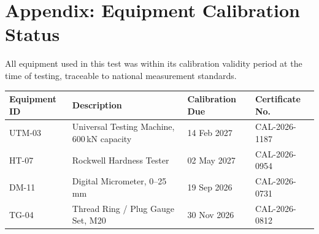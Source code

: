 \section{Appendix: Equipment Calibration Status}

All equipment used in this test was within its calibration validity period at the time of
testing, traceable to national measurement standards.

\begin{tabularx}{\linewidth}{@{}p{2.6cm}Xp{2.6cm}X@{}}
\toprule
\textbf{Equipment ID} & \textbf{Description} & \textbf{Calibration Due} & \textbf{Certificate No.} \\
\midrule
UTM-03 & Universal Testing Machine, 600\,kN capacity & 14 Feb 2027 & CAL-2026-1187 \\
HT-07 & Rockwell Hardness Tester & 02 May 2027 & CAL-2026-0954 \\
DM-11 & Digital Micrometer, 0--25\,mm & 19 Sep 2026 & CAL-2026-0731 \\
TG-04 & Thread Ring / Plug Gauge Set, M20 & 30 Nov 2026 & CAL-2026-0812 \\
\bottomrule
\end{tabularx}

\vspace{1.4em}

\renewcommand{\refname}{References}


